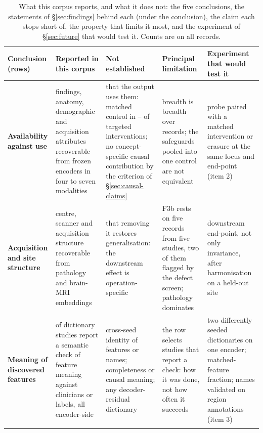 \begin{table}[!tb]
\centering\footnotesize\setlength\tabcolsep{3pt}\renewcommand{\arraystretch}{1.08}
\caption{What this corpus reports, and what it does not: the five conclusions, the statements of
\S\ref{sec:findings} behind each (under the conclusion), the claim each stops short of, the property that limits it most, and the
experiment of \S\ref{sec:future} that would test it. Counts are on all records.}
\label{tab:synthesis}
\begin{tabular}{@{}L{2.45cm}L{3.3cm}L{3.2cm}L{3.2cm}L{3.2cm}@{}}
\toprule
Conclusion (rows) & Reported in this corpus & Not established & Principal limitation & Experiment that would test it \\
\midrule
\textbf{Availability against use}  & findings, anatomy, demographic and acquisition attributes recoverable from frozen encoders in four to seven modalities & that the output uses them: matched control in \Vspca{}--\Vspc{} of \Vspcn{} targeted interventions; no concept-specific causal contribution by the criterion of \S\ref{sec:causal-claims} & breadth is breadth over records; the safeguards pooled into one control are not equivalent & probe paired with a matched intervention or erasure at the same locus and end-point (item 2) \\
\addlinespace[2pt]
\textbf{Acquisition and site structure}  & centre, scanner and acquisition structure recoverable from pathology and brain-MRI embeddings & that removing it restores generalisation: the downstream effect is operation-specific & F3b rests on five records from five studies, two of them flagged by the defect screen; pathology dominates & downstream end-point, not only invariance, after harmonisation on a held-out site \\
\addlinespace[2pt]
\textbf{Meaning of discovered features}  & \Nsaeval{} of \Nsae{} dictionary studies report a semantic check of feature meaning against clinicians or labels, all encoder-side & cross-seed identity of features or names; completeness or causal meaning; any decoder-residual dictionary & the row selects studies that report a check: how it was done, not how often it succeeds & two differently seeded dictionaries on one encoder; matched-feature fraction; names validated on region annotations (item 3) \\
\addlinespace[2pt]

\end{tabular}
\end{table}
